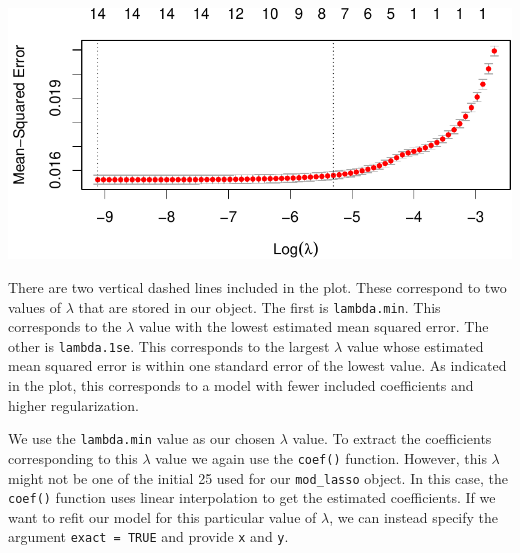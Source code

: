 \documentclass[
  letterpaper,
]{latex/krantz}
\begin{document}
\begin{center}
\includegraphics[width=1\textwidth,height=\textheight]{book/model_selection_files/figure-pdf/unnamed-chunk-11-1.pdf}
\end{center}

There are two vertical dashed lines included in the plot. These
correspond to two values of \(\lambda\) that are stored in our object.
The first is \texttt{lambda.min}. This corresponds to the \(\lambda\)
value with the lowest estimated mean squared error. The other is
\texttt{lambda.1se}. This corresponds to the largest \(\lambda\) value
whose estimated mean squared error is within one standard error of the
lowest value. As indicated in the plot, this corresponds to a model with
fewer included coefficients and higher regularization.

We use the \texttt{lambda.min} value as our chosen \(\lambda\) value. To
extract the coefficients corresponding to this \(\lambda\) value we
again use the \texttt{coef()} function. However, this \(\lambda\) might
not be one of the initial 25 used for our \texttt{mod\_lasso} object. In
this case, the \texttt{coef()} function uses linear interpolation to get
the estimated coefficients. If we want to refit our model for this
particular value of \(\lambda\), we can instead specify the argument
\texttt{exact\ =\ TRUE} and provide \texttt{x} and \texttt{y}.
\end{document}

